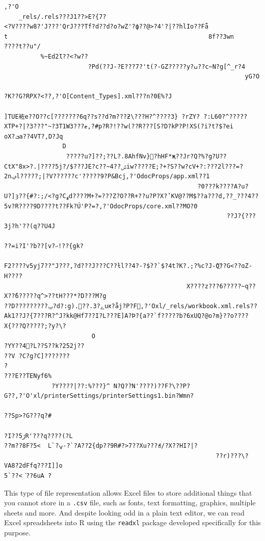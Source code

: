 \documentclass[
]{article}
\begin{document}
\begin{verbatim}
,?'O
    _rels/.rels???J1??>E?{7?
<?V????w8?'J???'QrJ???Tf?d??d?o?wZ'?ф??@>?4'?|??hlIo??Fǟ
t                                                       8f??3wn
????t??u"/
          %~Ed2Ɩ??<?w??
                       ?Pd(??J-?E???7?'t(?-GZ?????y?ߎ??c~N?g[^_r?4
                                                                  yG?O
                                                                      ?K??G?RPX?<??,?'O[Content_Types].xml???n?0E%?J
                                                                                                                    ]TUE袏e??O??c[???????6q??s??d?m???ƻ\???H?^????3} ?rZY? ?:L60?^?????XTP+?|?3???"~?3T1W3???ޓ,?#p?R?!??w(??R???[S?D?kP?P!XS(?i?t?$?ei
оX?ܒa??4VT?,D?Jq
                D
                 ?????u?]??;??L?.8AhfNv}߼?hHF*җ??Jr?Q?%?g?U??CtX"8x>?.|????5j?/$???JE?c??~ݜ??4iw?????E;?+?S??w?cV+?:???2l???=?2nݡl?????;|?V??????c'?????9?P&Bcj,?'OdocProps/app.xml??1
                                                     ?0???k????A?u?U?]ȝ??{#?:;/<?g?Cߩd????M+?=???Z?O??R+??u?P?X?̔ KV@??M$??a???d,??_???4??5v?R????9D????t??Fk?Ú'P?=?,?'OdocProps/core.xml??MO?0
                                                             ??J?{???3j?h'??(q??U4J
                                                                                   ??=i?I'?b??[v?ޙ!??{gk?
                                                                                                         F2????v5yj7??"J???,?d???J???C??ƚl??4?-?$ۤ??`$?4t?K?.;?%c?J-Q҉??G<??ɑZ-H????
                                                  X????z???6?????~q??X??ٗ6?????q^>??tH???*?D???M?g
??D?????????ݐ?d?:g).ے?3.??׉uԟ?ǟj?P?F؝,?'Oxl/_rels/workbook.xml.rels??Ak1??J?{7???R?^J?kk@Hf7??I?L???E]A?Þ?{a??`f?????b?6xUQ?@o?m}??o????X{???Q?????;?y?\?
                        O
?YY??4΀?L??S??k?252j??
??V ?C?g?C]???????
?
???E??TENyf6%
             ?Y????|??:%???}^ N?Q?ۤ?N'????)??F?\??P?G??,?'O'xl/printerSettings/printerSettings1.bin?Wmn? 
                                                                                                        ??Sp>?G???q?#
                                                                                                                     ?I??ڒ5R'???q????(?L
??m??8F?5<  L`?ݍ-?`?A??2{dp??9R#?>7??Xu???ꋝ/?X??HI?|?
                                                          ??r)???\?VA8?2dFfq???I]]o
5`??<͘??6uA ?
\end{verbatim}

This type of file representation allows Excel files to store additional
things that you cannot store in a \texttt{.csv} file, such as fonts,
text formatting, graphics, multiple sheets and more. And despite looking
odd in a plain text editor, we can read Excel spreadsheets into R using
the \texttt{readxl} package developed specifically for this purpose.
\end{document}

